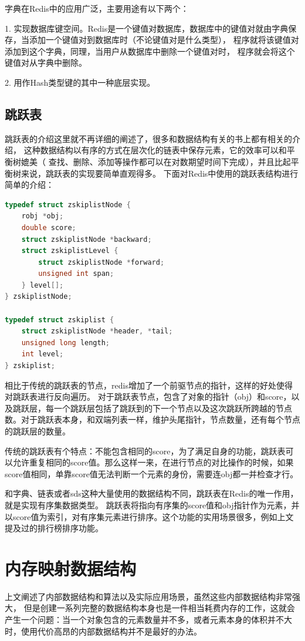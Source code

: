 \documentclass{zjutthesis}
\begin{document}
字典在Redis中的应用广泛，主要用途有以下两个：

1. 实现数据库键空间。Redis是一个键值对数据库，数据库中的键值对就由字典保存，当添加一个键值对到数据库时（不论键值对是什么类型）， 程序就将该键值对添加到这个字典，同理，当用户从数据库中删除一个键值对时， 程序就会将这个键值对从字典中删除。

2. 用作Hash类型键的其中一种底层实现。

\subsection{跳跃表}
跳跃表的介绍这里就不再详细的阐述了，很多和数据结构有关的书上都有相关的介绍， 这种数据结构以有序的方式在层次化的链表中保存元素，它的效率可以和平衡树媲美（ 查找、删除、添加等操作都可以在对数期望时间下完成），并且比起平衡树来说，跳跃表的实现要简单直观得多。
下面对Redis中使用的跳跃表结构进行简单的介绍：
\begin{lstlisting}[language=C]
typedef struct zskiplistNode {
    robj *obj;
    double score;
    struct zskiplistNode *backward;
    struct zskiplistLevel {
        struct zskiplistNode *forward;
        unsigned int span;
    } level[];
} zskiplistNode;

typedef struct zskiplist {
    struct zskiplistNode *header, *tail;
    unsigned long length;
    int level;
} zskiplist;
\end{lstlisting}
相比于传统的跳跃表的节点，redis增加了一个前驱节点的指针，这样的好处使得对跳跃表进行反向遍历。
对于跳跃表节点，包含了对象的指针（obj）和score，以及跳跃层，每一个跳跃层包括了跳跃到的下一个节点以及这次跳跃所跨越的节点数。对于跳跃表本身，和双端列表一样，维护头尾指针，节点数量，还有每个节点的跳跃层的数量。

传统的跳跃表有个特点：不能包含相同的score，为了满足自身的功能，跳跃表可以允许重复相同的score值。那么这样一来，在进行节点的对比操作的时候，如果score值相同，单靠score值无法判断一个元素的身份，需要连obj都一并检查才行。

和字典、链表或者sds这种大量使用的数据结构不同，跳跃表在Redis的唯一作用，就是实现有序集数据类型。
跳跃表将指向有序集的score值和obj指针作为元素，并以score值为索引，对有序集元素进行排序。这个功能的实用场景很多，例如上文提及过的排行榜排序功能。


\section{内存映射数据结构}
上文阐述了内部数据结构和算法以及实际应用场景，虽然这些内部数据结构非常强大， 但是创建一系列完整的数据结构本身也是一件相当耗费内存的工作，这就会产生一个问题：当一个对象包含的元素数量并不多，或者元素本身的体积并不大时，使用代价高昂的内部数据结构并不是最好的办法。
\end{document}
